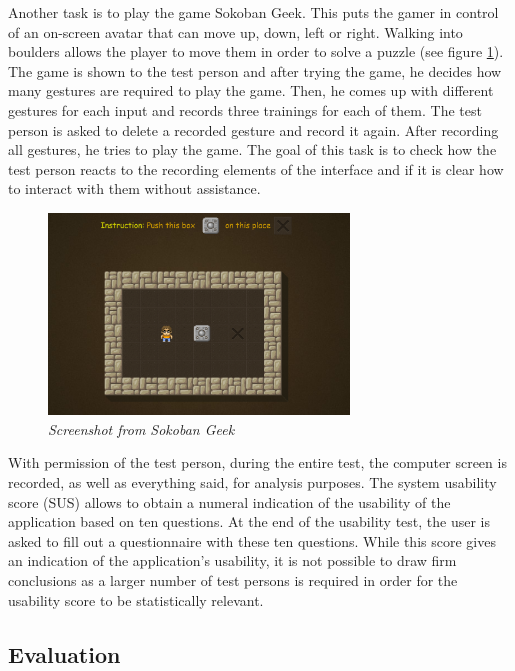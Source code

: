 Another task is to play the game Sokoban Geek. This puts the gamer in control of an on-screen avatar that can move up, down, left or right. Walking into boulders allows the player to move them in order to solve a puzzle (see figure \ref{fig: sokoban_geek}). The game is shown to the test person and after trying the game, he decides how many gestures are required to play the game. Then, he comes up with different gestures for each input and records three trainings for each of them. The test person is asked to delete a recorded gesture and record it again. After recording all gestures, he tries to play the game. The goal of this task is to check how the test person reacts to the recording elements of the interface and if it is clear how to interact with them without assistance.\\

\begin{figure}[H]
\begin{center}
\includegraphics[width=8cm]{SokobanGeek.png}
\caption{\emph{Screenshot from Sokoban Geek}}
\label{fig: sokoban_geek}
\end{center}
\end{figure}

With permission of the test person, during the entire test, the computer screen is recorded, as well as everything said, for analysis purposes. The system usability score (SUS) allows to obtain a numeral indication of the usability of the application based on ten questions. At the end of the usability test, the user is asked to fill out a questionnaire with these ten questions. While this score gives an indication of the application's usability, it is not possible to draw firm conclusions as a larger number of test persons is required in order for the usability score to be statistically relevant.


\subsection{Evaluation}

